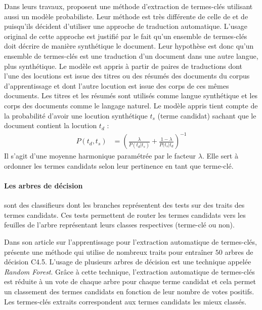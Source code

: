           Dans leurs travaux, \citet{liu2011vocabularygap} proposent une méthode
          d'extraction de termes-clés utilisant aussi un modèle probabiliste. Leur
          méthode est très différente de celle de \citet{witten1999kea} et de
          \citet{sujian2003maximumentropy} puisqu'ils décident d'utiliser une
          approche de traduction automatique. L'usage original de cette approche est
          justifié par le fait qu'un ensemble de termes-clés doit décrire de manière
          synthétique le document. Leur hypothèse est donc qu'un ensemble de
          termes-clés est une traduction d'un document dans une autre langue, plus
          synthétique. Le modèle est appris à partir de paires de traductions dont
          l'une des locutions est issue des titres ou des résumés des documents du corpus
          d'apprentissage et dont l'autre locution est issue des corps de ces mêmes
          documents. Les titres et les résumés sont utilisés comme langue
          synthétique et les corps des documents comme le langage naturel. Le modèle
          appris tient compte de la probabilité d'avoir une locution synthétique $t_s$
          (terme candidat) sachant que le document contient la locution $t_d$ :
            \begin{align}
              P(t_d, t_s) &= \left(\frac{\lambda}{P(t_d | t_s)} + \frac{1 - \lambda}{P(t_s | t_d}\right)^{-1}
            \end{align}
          Il s'agit d'une moyenne harmonique paramétrée par le facteur $\lambda$.
          Elle sert à ordonner les termes candidats selon leur pertinence en tant
          que terme-clé.

        \paragraph{Les arbres de décision}
          sont des classifieurs dont les branches représentent des tests sur des
          traits des termes candidats. Ces tests permettent de router les termes
          candidats vers les feuilles de l'arbre représentant leurs classes
          respectives (terme-clé ou non).

          Dans son article sur l'apprentissage pour l'extraction automatique de
          termes-clés, \citet{turney1999learningalgorithms} présente une méthode qui
          utilise de nombreux traits pour entraîner $50$ arbres de décision C4.5.
          L'usage de plusieurs arbres de décision est une technique appelée
          \textit{Random Forest}. Grâce à cette technique, l'extraction automatique
          de termes-clés est réduite à un vote de chaque arbre pour chaque terme
          candidat et cela permet un classement des termes candidats en fonction de
          leur nombre de votes positifs. Les termes-clés extraits correspondent aux
          termes candidats les mieux classés.

